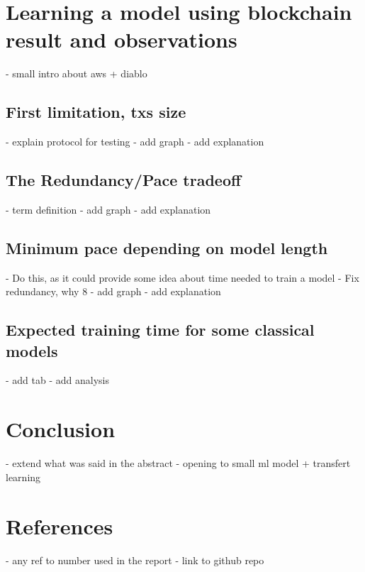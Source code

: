 \documentclass{article}
\begin{document}
\section{Learning a model using blockchain result and observations}
- small intro about aws + diablo
\subsection{First limitation, txs size}
- explain protocol for testing
- add graph
- add explanation
\subsection{The Redundancy/Pace tradeoff}
- term definition
- add graph
- add explanation
\subsection{Minimum pace depending on model length}
- Do this, as it could provide some idea about time needed to train a model
- Fix redundancy, why 8
- add graph
- add explanation
\subsection{Expected training time for some classical models}
- add tab
- add analysis
\section{Conclusion}
- extend what was said in the abstract
- opening to small ml model + transfert learning
\section{References}
- any ref to number used in the report
- link to github repo
\end{document}
